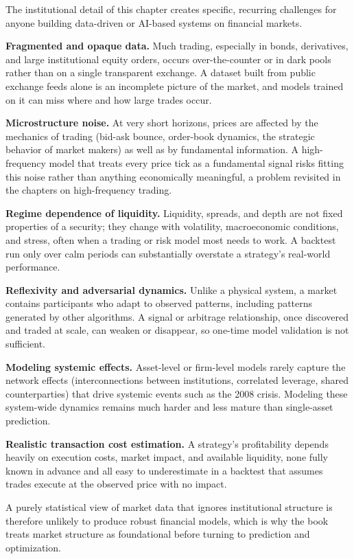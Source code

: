 \documentclass[../ai_in_finance]{subfiles}
\begin{document}
The institutional detail of this chapter creates specific, recurring challenges for anyone building data-driven or AI-based systems on financial markets.

\textbf{Fragmented and opaque data.} Much trading, especially in bonds, derivatives, and large institutional equity orders, occurs over-the-counter or in dark pools rather than on a single transparent exchange. A dataset built from public exchange feeds alone is an incomplete picture of the market, and models trained on it can miss where and how large trades occur.

\textbf{Microstructure noise.} At very short horizons, prices are affected by the mechanics of trading (bid-ask bounce, order-book dynamics, the strategic behavior of market makers) as well as by fundamental information. A high-frequency model that treats every price tick as a fundamental signal risks fitting this noise rather than anything economically meaningful, a problem revisited in the chapters on high-frequency trading.

\textbf{Regime dependence of liquidity.} Liquidity, spreads, and depth are not fixed properties of a security; they change with volatility, macroeconomic conditions, and stress, often when a trading or risk model most needs to work. A backtest run only over calm periods can substantially overstate a strategy's real-world performance.

\textbf{Reflexivity and adversarial dynamics.} Unlike a physical system, a market contains participants who adapt to observed patterns, including patterns generated by other algorithms. A signal or arbitrage relationship, once discovered and traded at scale, can weaken or disappear, so one-time model validation is not sufficient.

\textbf{Modeling systemic effects.} Asset-level or firm-level models rarely capture the network effects (interconnections between institutions, correlated leverage, shared counterparties) that drive systemic events such as the 2008 crisis. Modeling these system-wide dynamics remains much harder and less mature than single-asset prediction.

\textbf{Realistic transaction cost estimation.} A strategy's profitability depends heavily on execution costs, market impact, and available liquidity, none fully known in advance and all easy to underestimate in a backtest that assumes trades execute at the observed price with no impact.

A purely statistical view of market data that ignores institutional structure is therefore unlikely to produce robust financial models, which is why the book treats market structure as foundational before turning to prediction and optimization.
\end{document}
